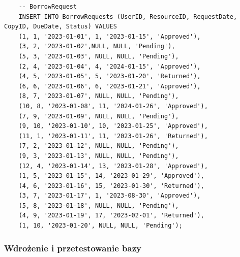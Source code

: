 \begin{verbatim}
    -- BorrowRequest
    INSERT INTO BorrowRequests (UserID, ResourceID, RequestDate, CopyID, DueDate, Status) VALUES
    (1, 1, '2023-01-01', 1, '2023-01-15', 'Approved'),
    (3, 2, '2023-01-02',NULL, NULL, 'Pending'),
    (5, 3, '2023-01-03', NULL, NULL, 'Pending'),
    (2, 4, '2023-01-04', 4, '2024-01-15', 'Approved'),
    (4, 5, '2023-01-05', 5, '2023-01-20', 'Returned'),
    (6, 6, '2023-01-06', 6, '2023-01-21', 'Approved'),
    (8, 7, '2023-01-07', NULL, NULL, 'Pending'),
    (10, 8, '2023-01-08', 11, '2024-01-26', 'Approved'),
    (7, 9, '2023-01-09', NULL, NULL, 'Pending'),
    (9, 10, '2023-01-10', 10, '2023-01-25', 'Approved'),
    (11, 1, '2023-01-11', 11, '2023-01-26', 'Returned'),
    (7, 2, '2023-01-12', NULL, NULL, 'Pending'),
    (9, 3, '2023-01-13', NULL, NULL, 'Pending'),
    (12, 4, '2023-01-14', 13, '2023-01-28', 'Approved'),
    (1, 5, '2023-01-15', 14, '2023-01-29', 'Approved'),
    (4, 6, '2023-01-16', 15, '2023-01-30', 'Returned'),
    (3, 7, '2023-01-17', 1, '2023-08-30', 'Approved'),
    (5, 8, '2023-01-18', NULL, NULL, 'Pending'),
    (4, 9, '2023-01-19', 17, '2023-02-01', 'Returned'),
    (1, 10, '2023-01-20', NULL, NULL, 'Pending');
\end{verbatim}

\subsubsection{Wdrożenie i przetestowanie bazy}

